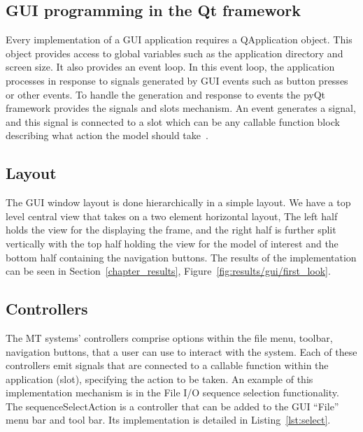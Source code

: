 \subsection{GUI programming in the Qt framework}
Every implementation of a GUI application requires a QApplication object. This
object provides access to global variables such as the application directory and
screen size. It also provides an event loop. In this event loop, the application
processes in response to signals generated by GUI events such as button
presses or other events.
To handle the generation and response to events the pyQt framework provides the
signals and slots mechanism. An event generates a signal, and this signal is
connected to a slot which can be any callable function block describing what
action the model should take~\cite{Summerfield}.

\subsection{Layout}
The GUI window layout is done hierarchically in a simple layout. We have a top
level central view that takes on a two element horizontal layout, The left half
holds the view for the displaying the frame, and the right half is further split
vertically with the top half holding the view for the model of interest and the
bottom half containing the navigation buttons.
The results of the implementation can be seen in Section~\ref{chapter_results},
Figure~\ref{fig:results/gui/first_look}.

\subsection{Controllers}
The MT systems' controllers comprise options within the file menu, toolbar,
navigation buttons, that a user can use to interact with the system. Each of
these controllers emit signals that are connected to a callable function within
the application (slot), specifying the action to be taken.
An example of this implementation mechanism is in the File I/O sequence
selection functionality. 
The sequenceSelectAction is a controller that can be added to the GUI ``File'' menu
bar and tool bar. Its implementation is detailed in Listing~\ref{lst:select}. 

